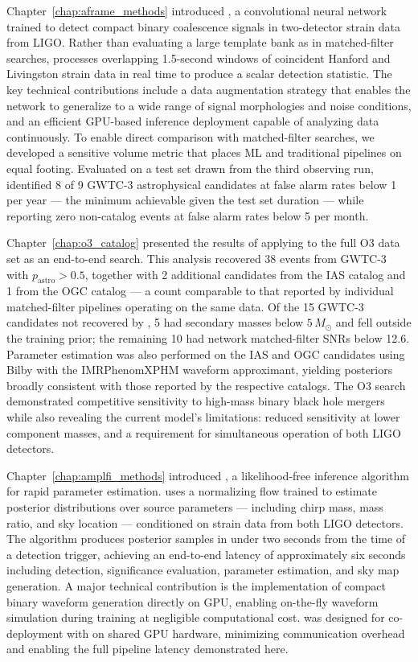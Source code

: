 Chapter~\ref{chap:aframe_methods} introduced \aframe, a convolutional neural network trained to detect compact binary coalescence signals in two-detector strain data from LIGO.
Rather than evaluating a large template bank as in matched-filter searches, \aframe processes overlapping 1.5-second windows of coincident Hanford and Livingston strain data in real time to produce a scalar detection statistic.
The key technical contributions include a data augmentation strategy that enables the network to generalize to a wide range of signal morphologies and noise conditions, and an efficient GPU-based inference deployment capable of analyzing data continuously.
To enable direct comparison with matched-filter searches, we developed a sensitive volume metric that places ML and traditional pipelines on equal footing.
Evaluated on a test set drawn from the third observing run, \aframe identified 8 of 9 GWTC-3 astrophysical candidates at false alarm rates below 1 per year --- the minimum achievable given the test set duration --- while reporting zero non-catalog events at false alarm rates below 5 per month.

Chapter~\ref{chap:o3_catalog} presented the results of applying \aframe to the full O3 data set as an end-to-end search.
This analysis recovered 38 events from GWTC-3 with $p_\mathrm{astro} > 0.5$, together with 2 additional candidates from the IAS catalog and 1 from the OGC catalog --- a count comparable to that reported by individual matched-filter pipelines operating on the same data.
Of the 15 GWTC-3 candidates not recovered by \aframe, 5 had secondary masses below $5\,M_\odot$ and fell outside the training prior; the remaining 10 had network matched-filter SNRs below 12.6.
Parameter estimation was also performed on the IAS and OGC candidates using Bilby with the IMRPhenomXPHM waveform approximant, yielding posteriors broadly consistent with those reported by the respective catalogs.
The O3 search demonstrated competitive sensitivity to high-mass binary black hole mergers while also revealing the current model's limitations: reduced sensitivity at lower component masses, and a requirement for simultaneous operation of both LIGO detectors.

Chapter~\ref{chap:amplfi_methods} introduced \amplfi, a likelihood-free inference algorithm for rapid parameter estimation.
\amplfi uses a normalizing flow trained to estimate posterior distributions over source parameters --- including chirp mass, mass ratio, and sky location --- conditioned on strain data from both LIGO detectors.
The algorithm produces posterior samples in under two seconds from the time of a detection trigger, achieving an end-to-end latency of approximately six seconds including detection, significance evaluation, parameter estimation, and sky map generation.
A major technical contribution is the implementation of compact binary waveform generation directly on GPU, enabling on-the-fly waveform simulation during training at negligible computational cost.
\amplfi was designed for co-deployment with \aframe on shared GPU hardware, minimizing communication overhead and enabling the full pipeline latency demonstrated here.

